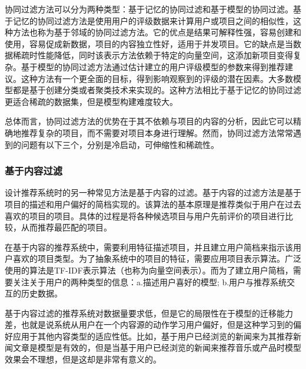 协同过滤方法可以分为两种类型：基于记忆的协同过滤和基于模型的协同过滤。基于记忆的协同过滤方法是使用用户的评级数据来计算用户或项目之间的相似性，这种方法也称为基于邻域的协同过滤方法\cite{rec6}。它的优点是结果可解释性强，容易创建和使用，容易促成新数据，项目的内容独立性好，适用于并发项目。它的缺点是当数据稀疏时性能降低，同时该表示方法依赖于特定的向量空间，这添加新项目变得复杂。基于模型的协同过滤方法通过估计建立的用户评级模型的参数来得到推荐建议。这种方法有一个更全面的目标，得到影响观察到的评级的潜在因素\cite{rec11}。大多数模型都是基于创建分类或者聚类技术来实现的。这种方法相比于基于记忆的协同过滤更适合稀疏的数据集，但是模型构建难度较大。

总体而言，协同过滤方法的优势在于其不依赖与项目的内容的分析，因此它可以精确地推荐复杂的项目，而不需要对项目本身进行理解。然而，协同过滤方法常常遇到的问题有以下三个，分别是冷启动，可伸缩性和稀疏性\cite{rec7}。
\subsubsection{基于内容过滤}

设计推荐系统时的另一种常见方法是基于内容的过滤。基于内容的过滤方法是基于项目的描述和用户偏好的简档实现的\cite{rec8}。该算法的基本原理是推荐类似于用户在过去喜欢的项目的项目。具体的过程是将各种候选项目与用户先前评价的项目进行比较，从而推荐最匹配的项目。

在基于内容的推荐系统中，需要利用特征描述项目，并且建立用户简档来指示该用户喜欢的项目类型。为了抽象系统中的项目的特征，需要应用项目表示算法。广泛使用的算法是TF-IDF表示算法（也称为向量空间表示）\cite{rec9}。而为了建立用户简档，需要关注关于用户的两种类型的信息：a.描述用户喜好的模型; b.用户与推荐系统交互的历史数据。

基于内容过滤的推荐系统对数据量要求低，但是它的局限性在于模型的迁移能力差，也就是说系统从用户在一个内容源的动作学习用户偏好，但是这种学习到的偏好应用于其他内容类型的适应性低。比如，基于用户已经浏览的新闻来为其推荐新闻文章是模型是有效的，但是当基于用户已经浏览的新闻来推荐音乐或产品时模型效果会不理想，但是这却是非常有意义的。
